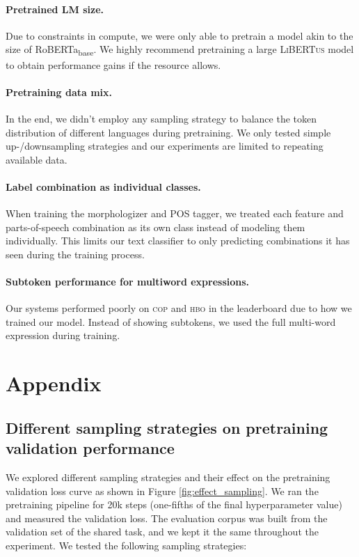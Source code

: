 \documentclass[11pt]{article}
\newcommand{\libertus}{\textsc{LiBERTus}}
\begin{document}
\paragraph{Pretrained LM size.}
Due to constraints in compute, we were only able to pretrain a model akin to the size of RoBERTa\textsubscript{base}.
We highly recommend pretraining a large \libertus{} model to obtain performance gains if the resource allows.

\paragraph{Pretraining data mix.}
In the end, we didn't employ any sampling strategy to balance the token distribution of different languages during pretraining.
We only tested simple up-/downsampling strategies and our experiments are limited to repeating available data.

\paragraph{Label combination as individual classes.}
When training the morphologizer and POS tagger, we treated each feature and parts-of-speech combination as its own class instead of modeling them individually.
This limits our text classifier to only predicting combinations it has seen during the training process.

\paragraph{Subtoken performance for multiword expressions.}
Our systems performed poorly on \textsc{cop} and \textsc{hbo} in the leaderboard due to how we trained our model.
Instead of showing subtokens, we used the full multi-word expression during training.



\appendix

\section{Appendix}
\label{sec:appendix}

\subsection{Different sampling strategies on pretraining validation performance}
\label{sec:appendix_sampling}

We explored different sampling strategies and their effect on the pretraining validation loss curve as shown in Figure \ref{fig:effect_sampling}.
We ran the pretraining pipeline for 20k steps (one-fifths of the final hyperparameter value) and measured the validation loss.
The evaluation corpus was built from the validation set of the shared task, and we kept it the same throughout the experiment.
We tested the following sampling strategies:
\end{document}

